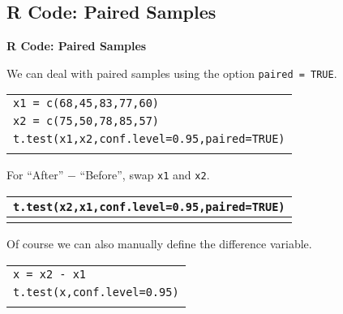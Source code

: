 \documentclass[compress]{beamer}        %
\makeatletter
\newcommand{\tcb}{\textcolor{beamer@blendedblue}}
\makeatother
\begin{document}
\subsection{R Code: Paired Samples}
\begin{frame}{\bf \tcb{R Code: Paired Samples}}

We can deal with paired samples using the option \texttt{paired = TRUE}.\\[0.2cm]

\begin{tabular}{|l|}
\hline
\texttt{x1 = c(68,45,83,77,60)}\\[0.2cm]
\texttt{x2 = c(75,50,78,85,57)}\\[0.2cm]
\texttt{t.test(x1,x2,conf.level=0.95,paired=TRUE)}\\
\hline
\multicolumn{1}{c}{}\\[0.2cm]
\end{tabular}

For ``After'' $-$ ``Before'', swap \texttt{x1} and \texttt{x2}.\\[0.2cm]

\begin{tabular}{|l|}
\hline
\texttt{t.test(x2,x1,conf.level=0.95,paired=TRUE)}\\
\hline
\multicolumn{1}{c}{}\\[0.2cm]
\end{tabular}

Of course we can also manually define the difference variable.\\[0.2cm]

\begin{tabular}{|l|}
\hline
\texttt{x = x2 - x1}\\[0.2cm]
\texttt{t.test(x,conf.level=0.95)}\\
\hline
\multicolumn{1}{c}{}\\[0.0cm]
\end{tabular}


\end{frame}
\end{document}
